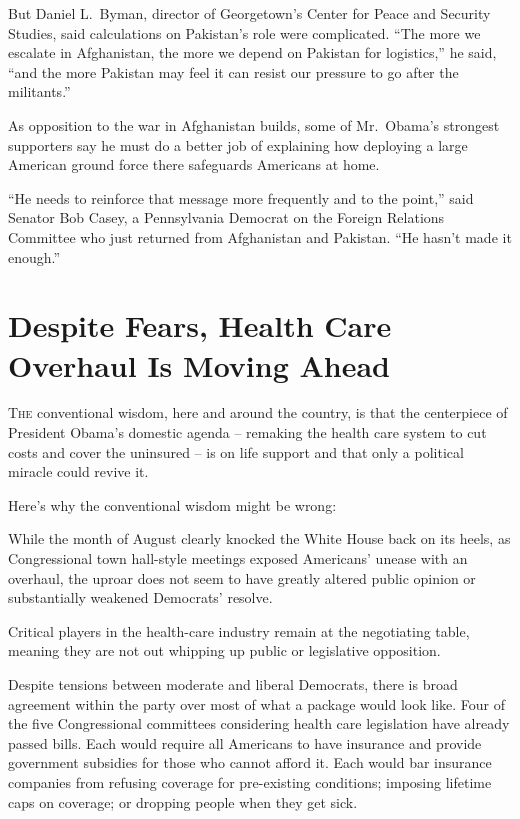 ﻿\documentclass[12pt]{article}
\begin{document}
But Daniel L.~Byman, director of Georgetown's Center for Peace and Security Studies, said
calculations on Pakistan's role were complicated. ``The more we escalate in Afghanistan, the more we
depend on Pakistan for logistics,'' he said, ``and the more Pakistan may feel it can resist our
pressure to go after the militants.''

As opposition to the war in Afghanistan builds, some of Mr.~Obama's strongest supporters say he must
do a better job of explaining how deploying a large American ground force there safeguards Americans
at home.

``He needs to reinforce that message more frequently and to the point,'' said Senator Bob Casey, a
Pennsylvania Democrat on the Foreign Relations Committee who just returned from Afghanistan and
Pakistan. ``He hasn't made it enough.'' 

\section{Despite Fears, Health Care Overhaul Is Moving Ahead}

\lettrine{T}{he} conventional wisdom, here and around the country, is that the centerpiece of
President Obama's domestic agenda -- remaking the health care system to cut costs and cover the
uninsured -- is on life support and that only a political miracle could revive it.

Here's why the conventional wisdom might be wrong:

While the month of August clearly knocked the White House back on its heels, as Congressional town
hall-style meetings exposed Americans' unease with an overhaul, the uproar does not seem to have
greatly altered public opinion or substantially weakened Democrats' resolve.

Critical players in the health-care industry remain at the negotiating table, meaning they are not
out whipping up public or legislative opposition.

Despite tensions between moderate and liberal Democrats, there is broad agreement within the party
over most of what a package would look like. Four of the five Congressional committees considering
health care legislation have already passed bills. Each would require all Americans to have
insurance and provide government subsidies for those who cannot afford it. Each would bar insurance
companies from refusing coverage for pre-existing conditions; imposing lifetime caps on coverage; or
dropping people when they get sick.
\end{document}
